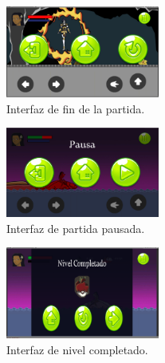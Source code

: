 \begin{figure}[H]
    \centering
    \includegraphics[width=0.45\textwidth]{Anexos/Interfaces/finJuego.png}
    \caption{Interfaz de fin de la partida.}
    \label{fig:Game02}
\end{figure}

\begin{figure}[H]
    \centering
    \includegraphics[width=0.45\textwidth]{Anexos/Interfaces/menuPausa.png}
    \caption{Interfaz de partida pausada.}
    \label{fig:Game02}
\end{figure}

\begin{figure}[H]
    \centering
    \includegraphics[width=0.45\textwidth]{Anexos/Interfaces/InterfazJuego08.png}
    \caption{Interfaz de nivel completado.}
    \label{fig:Game02}
\end{figure}